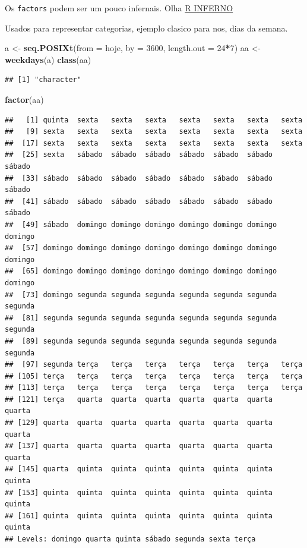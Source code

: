 \documentclass[]{book}
\newenvironment{Shaded}{\begin{snugshade}}{\end{snugshade}}
\newcommand{\KeywordTok}[1]{\textcolor[rgb]{0.13,0.29,0.53}{\textbf{#1}}}
\newcommand{\DataTypeTok}[1]{\textcolor[rgb]{0.13,0.29,0.53}{#1}}
\newcommand{\DecValTok}[1]{\textcolor[rgb]{0.00,0.00,0.81}{#1}}
\newcommand{\StringTok}[1]{\textcolor[rgb]{0.31,0.60,0.02}{#1}}
\newcommand{\OperatorTok}[1]{\textcolor[rgb]{0.81,0.36,0.00}{\textbf{#1}}}
\newcommand{\NormalTok}[1]{#1}
\begin{document}
Os \texttt{factors} podem ser um pouco infernais. Olha
\href{http://www.burns-stat.com/documents/books/the-r-inferno/}{R
INFERNO}

Usados para representar categorias, ejemplo clasico para nos, dias da
semana.

\begin{Shaded}
\begin{Highlighting}[]
\NormalTok{a <-}\StringTok{ }\KeywordTok{seq.POSIXt}\NormalTok{(}\DataTypeTok{from =}\NormalTok{ hoje, }\DataTypeTok{by =} \DecValTok{3600}\NormalTok{, }\DataTypeTok{length.out =} \DecValTok{24}\OperatorTok{*}\DecValTok{7}\NormalTok{)}
\NormalTok{aa <-}\StringTok{ }\KeywordTok{weekdays}\NormalTok{(a)}
\KeywordTok{class}\NormalTok{(aa)}
\end{Highlighting}
\end{Shaded}

\begin{verbatim}
## [1] "character"
\end{verbatim}

\begin{Shaded}
\begin{Highlighting}[]
\KeywordTok{factor}\NormalTok{(aa)}
\end{Highlighting}
\end{Shaded}

\begin{verbatim}
##   [1] quinta  sexta   sexta   sexta   sexta   sexta   sexta   sexta  
##   [9] sexta   sexta   sexta   sexta   sexta   sexta   sexta   sexta  
##  [17] sexta   sexta   sexta   sexta   sexta   sexta   sexta   sexta  
##  [25] sexta   sábado  sábado  sábado  sábado  sábado  sábado  sábado 
##  [33] sábado  sábado  sábado  sábado  sábado  sábado  sábado  sábado 
##  [41] sábado  sábado  sábado  sábado  sábado  sábado  sábado  sábado 
##  [49] sábado  domingo domingo domingo domingo domingo domingo domingo
##  [57] domingo domingo domingo domingo domingo domingo domingo domingo
##  [65] domingo domingo domingo domingo domingo domingo domingo domingo
##  [73] domingo segunda segunda segunda segunda segunda segunda segunda
##  [81] segunda segunda segunda segunda segunda segunda segunda segunda
##  [89] segunda segunda segunda segunda segunda segunda segunda segunda
##  [97] segunda terça   terça   terça   terça   terça   terça   terça  
## [105] terça   terça   terça   terça   terça   terça   terça   terça  
## [113] terça   terça   terça   terça   terça   terça   terça   terça  
## [121] terça   quarta  quarta  quarta  quarta  quarta  quarta  quarta 
## [129] quarta  quarta  quarta  quarta  quarta  quarta  quarta  quarta 
## [137] quarta  quarta  quarta  quarta  quarta  quarta  quarta  quarta 
## [145] quarta  quinta  quinta  quinta  quinta  quinta  quinta  quinta 
## [153] quinta  quinta  quinta  quinta  quinta  quinta  quinta  quinta 
## [161] quinta  quinta  quinta  quinta  quinta  quinta  quinta  quinta 
## Levels: domingo quarta quinta sábado segunda sexta terça
\end{verbatim}
\end{document}

